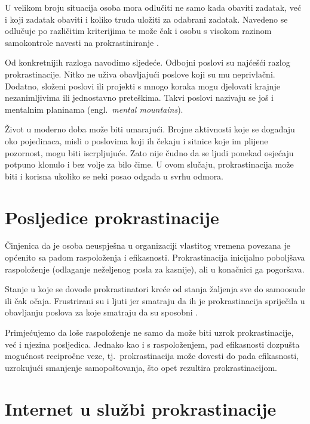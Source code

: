 \documentclass[11pt,twocolumn,english]{article}
\newcommand{\engl}[1]{(engl.~\emph{#1})}
\begin{document}
U velikom broju situacija osoba mora odlučiti ne samo kada obaviti zadatak, već
i koji zadatak obaviti i koliko truda uložiti za odabrani zadatak.
Navedeno se odlučuje po različitim kriterijima te može čak i osobu s visokom
razinom samokontrole navesti na prokrastiniranje \cite{o2001choice}.

Od konkretnijih razloga \cite{PickBrain5reasons, Lifehack6reasons} navodimo
sljedeće. Odbojni poslovi su najćešći razlog prokrastinacije. Nitko ne uživa
obavljajući poslove koji su mu neprivlačni. Dodatno, složeni poslovi ili
projekti s mnogo koraka mogu djelovati krajnje nezanimljivima ili jednostavno
preteškima. Takvi poslovi nazivaju se još i mentalnim planinama \engl{mental
mountains}.

Život u moderno doba može biti umarajući. Brojne aktivnosti koje se
događaju oko pojedinaca, misli o poslovima koji ih čekaju i sitnice koje im
plijene pozornost, mogu biti iscrpljujuće. Zato nije čudno da se ljudi ponekad
osjećaju potpuno klonulo i bez volje za bilo čime. U ovom slučaju,
prokrastinacija može biti i korisna ukoliko se neki posao odgađa u svrhu odmora.

\section{Posljedice prokrastinacije}
Činjenica da je osoba neuspješna u organizaciji vlastitog vremena povezana je
općenito sa padom raspoloženja i efikasnosti. Prokrastinacija inicijalno
poboljšava raspoloženje (odlaganje neželjenog posla za kasnije), ali u
konačnici ga pogoršava.

Stanje u koje se dovode prokrastinatori kreće od
stanja žaljenja sve do samoosude ili čak očaja. Frustrirani su i ljuti jer
smatraju da ih je prokrastinacija spriječila u obavljanju poslova za koje
smatraju da su sposobni \cite{burka2004procrastination}.

Primjećujemo da loše raspoloženje ne samo da može biti uzrok prokrastinacije,
već i njezina posljedica. Jednako kao i s raspoloženjem, pad efikasnosti
dozpušta mogućnost recipročne veze, tj.~prokrastinacija može dovesti do pada
efikasnosti, uzrokujući smanjenje samopoštovanja, što opet rezultira prokrastinacijom.


\section{Internet u službi prokrastinacije}
\end{document}
